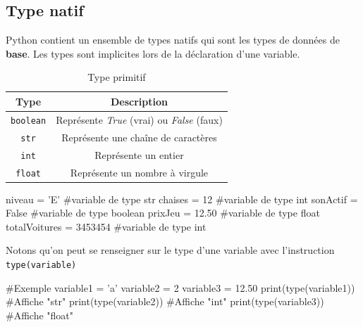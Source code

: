 \subsection{Type natif}\label{prim}

Python contient un ensemble de types natifs qui sont les types de données de \textbf{base}. Les types sont implicites lors de la déclaration d'une variable.

\begin{table}[!h]
    \centering
    \begin{tabular}{|c|c|}
        \hline
        Type & Description \\
        \hline
        \texttt{boolean} & Représente \textit{True} (vrai) ou \textit{False} (faux) \\
        \hline
        \texttt{str} & Représente une chaîne de caractères \\
        \hline
        \texttt{int} & Représente un entier\\
        \hline
        \texttt{float} & Représente un nombre à virgule\\
        \hline
    \end{tabular}
    \caption{Type primitif}
    \label{table-primitifs}
\end{table}

\begin{python}[caption = Types de variables]
niveau = 'E'  #variable de type str
chaises = 12  #variable de type int
sonActif = False  #variable de type boolean
prixJeu = 12.50  #variable de type float
totalVoitures = 3453454  #variable de type int
\end{python}

Notons qu'on peut se renseigner sur le type d'une variable avec l'instruction \texttt{type(variable)}
\begin{python}[caption = Instruction type]
#Exemple
variable1 = 'a' 
variable2 = 2
variable3 = 12.50
print(type(variable1)) #Affiche "str"
print(type(variable2)) #Affiche "int"
print(type(variable3)) #Affiche "float"
\end{python}

